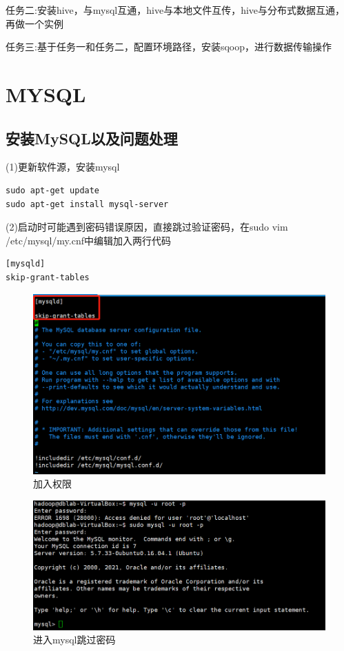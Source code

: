 \documentclass[12pt]{article}
\begin{document}
\noindent\qquad 任务二:安装hive，与mysql互通，hive与本地文件互传，hive与分布式数据互通，再做一个实例

\noindent\qquad 任务三:基于任务一和任务二，配置环境路径，安装sqoop，进行数据传输操作

\section{MYSQL}
\subsection{安装MySQL以及问题处理}

(1)更新软件源，安装mysql
\begin{lstlisting}[language={[ANSI]C}]
sudo apt-get update
sudo apt-get install mysql-server
\end{lstlisting}


(2)启动时可能遇到密码错误原因，直接跳过验证密码，在sudo vim /etc/mysql/my.cnf中编辑加入两行代码
\begin{lstlisting}[language={[ANSI]C}]
[mysqld]
skip-grant-tables
\end{lstlisting}


\begin{figure}[ht]
\centering
\includegraphics[scale=0.7]{figures/1.png}
\caption{加入权限}\label{fig:label2}
\end{figure}

\begin{figure}[ht]
\centering
\includegraphics[scale=0.8]{figures/2.png}
\caption{进入mysql跳过密码}\label{fig:label2}
\end{figure}
\end{document}
